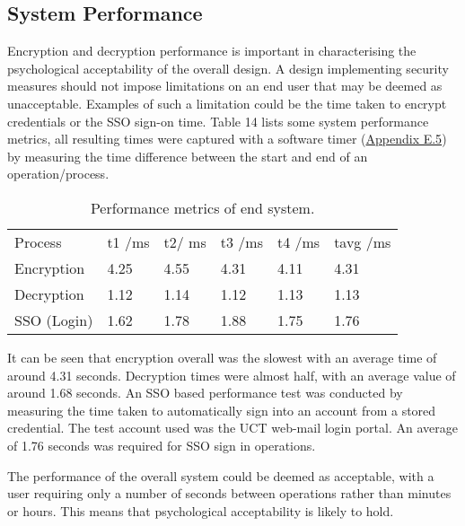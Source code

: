 \subsection{System Performance}
Encryption and decryption performance is important in characterising the psychological acceptability of the overall design. A design implementing security measures should not impose limitations on an end user that may be deemed as unacceptable. Examples of such a limitation could be the time taken to encrypt credentials or the SSO sign-on time. Table 14 lists some system performance metrics, all resulting times were captured with a software timer (\hyperref[sec:timerc]{Appendix E.5}) by measuring the time difference between the start and end of an operation/process.

\begin{table}[H]
\centering
\begin{tabular}{llllll}
Process     & t1 /ms & t2/ ms & t3 /ms & t4 /ms & tavg /ms \\
Encryption  & 4.25   & 4.55   & 4.31   & 4.11   & 4.31     \\
Decryption  & 1.12   & 1.14   & 1.12   & 1.13   & 1.13     \\
SSO (Login) & 1.62   & 1.78   & 1.88   & 1.75   & 1.76    
\end{tabular}
\caption{Performance metrics of end system.}
\end{table}

It can be seen that encryption overall was the slowest with an average time of around 4.31 seconds. Decryption times were almost half, with an average value of around 1.68 seconds. An SSO based performance test was conducted by measuring the time taken to automatically sign into an account from a stored credential. The test account used was the UCT web-mail login portal. An average of 1.76 seconds was required for SSO sign in operations.

The performance of the overall system could be deemed as acceptable, with a user requiring only a number of seconds between operations rather than minutes or hours. This means that psychological acceptability is likely to hold.
